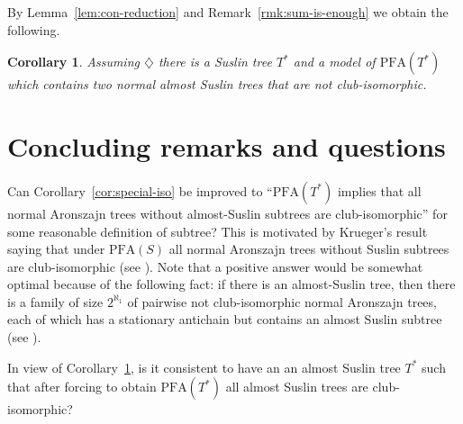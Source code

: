 \documentclass{amsart}
\newtheorem{corollary}[theorem]{Corollary}
\theoremstyle{definition}
\newcommand{\PFA}{\mathrm{PFA}}
\begin{document}
By Lemma~\ref{lem:con-reduction} and Remark~\ref{rmk:sum-is-enough}
we obtain the following.

\begin{corollary}\label{cor:con-non-iso}
  Assuming $\diamondsuit$ there is a Suslin tree $T^{*}$ and a model of $\PFA(T^{*})$ which contains two normal
  almost Suslin trees that are not club-isomorphic.
\end{corollary}


\section{Concluding remarks and questions}\label{sec:questions}

Can Corollary~\ref{cor:special-iso} be improved to ``$\PFA(T^{*})$ implies
that all normal Aronszajn trees without almost-Suslin
subtrees are club-isomorphic'' for some reasonable definition of
subtree? This is motivated by Krueger's result saying that under
$\PFA(S)$ all normal Aronszajn trees without Suslin subtrees are
club-isomorphic (see \cite{Krueger2025}). Note that a positive answer
would be somewhat optimal because of the following fact: if there is an
almost-Suslin tree, then there is a family of size $2^{\aleph_{1}}$ of
pairwise not club-isomorphic normal Aronszajn trees, each of which has
a stationary antichain but contains an almost Suslin subtree
(see \cite[5.15 (v)]{Todorcevic1984}).

In view of Corollary~\ref{cor:con-non-iso}, is it consistent to have an
an almost Suslin tree $T^{*}$ such that after forcing to
obtain $\PFA(T^{*})$ all almost Suslin trees are club-isomorphic?
\end{document}
